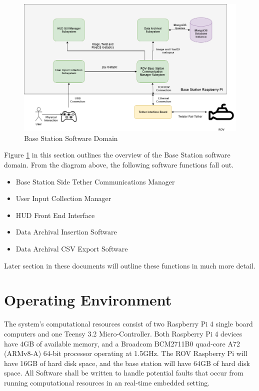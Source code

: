 \documentclass{scrreprt}
\begin{document}
\begin{figure}[!ht]
    \centering
    \includegraphics[scale=0.45]{BaseStationDomainSoftware.png}
    \caption{Base Station Software Domain}
    \label{fig:Base Station Software Domain}
\end{figure}
\FloatBarrier

Figure \ref{fig:Base Station Software Domain} in this section outlines the overview of the Base Station software domain. From the diagram above, the following software functions fall out.

\begin{itemize}
    \item Base Station Side Tether Communications Manager
    \item User Input Collection Manager
    \item HUD Front End Interface
    \item Data Archival Insertion Software
    \item Data Archival CSV Export Software
\end{itemize}
Later section in these documents will outline these functions in much more detail.

\section{Operating Environment}
The system's computational resources consist of two Raspberry Pi 4 single board computers and one Teensy 3.2 Micro-Controller. Both Raspberry Pi 4 devices have 4GB of available memory, and a Broadcom BCM2711B0 quad-core A72 (ARMv8-A) 64-bit processor operating at 1.5GHz. The ROV Raspberry Pi will have 16GB of hard disk space, and the base station will have 64GB of hard disk space. All Software shall be written to handle potential faults that occur from running computational resources in an real-time embedded setting.
\end{document}

